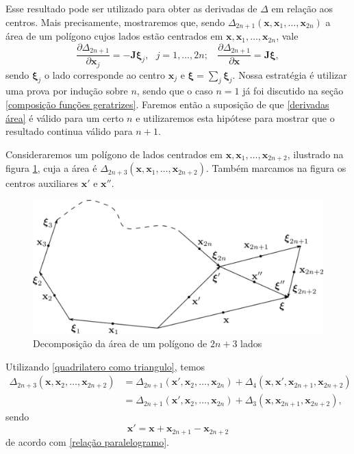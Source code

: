 \documentclass[
	12pt,
	oneside,			%
	a4paper,			%
	english,			%
	brazil				%
	]{abntex2}
\theoremstyle{definition}
\begin{document}
\begin{apendicesenv}
Esse resultado pode ser utilizado para obter as derivadas de $\Delta$ em relação aos centros. Mais precisamente, mostraremos que, sendo $\Delta_{2n+1}\left(\mathbf{x},\mathbf{x}_1,\ldots,\mathbf{x}_{2n}\right)$ a área de um polígono cujos lados estão centrados em $\mathbf{x},\mathbf{x}_1,\ldots,\mathbf{x}_{2n}$, vale
\begin{equation}
    \label{derivadas área}
    \frac{\partial \Delta_{2n+1}}{\partial \mathbf{x}_j} = - \mathbf{J} \boldsymbol{\xi}_j, \ \ \ j = 1,\ldots,2n; \ \ \ \ \frac{\partial \Delta_{2n+1}}{\partial \mathbf{x}} = \mathbf{J} \boldsymbol{\xi},
\end{equation}
sendo $\boldsymbol{\xi}_j$ o lado corresponde ao centro $\mathbf{x}_j$ e $\boldsymbol{\xi} = \sum_j \boldsymbol{\xi}_j$. Nossa estratégia é utilizar uma prova por indução sobre $n$, sendo que o caso $n=1$ já foi discutido na seção \ref{composição funções geratrizes}. Faremos então a suposição de que \eqref{derivadas área} é válido para um certo $n$ e utilizaremos esta hipótese para mostrar que o resultado continua válido para $n+1$.

Consideraremos um polígono de lados centrados em $\mathbf{x},\mathbf{x}_1,\ldots,\mathbf{x}_{2n+2}$, ilustrado na figura \ref{poligono grande}, cuja a área é $\Delta_{2n+3}\left(\mathbf{x},\mathbf{x}_1,\ldots,\mathbf{x}_{2n+2}\right)$. Também marcamos na figura os centros auxiliares $\mathbf{x}'$ e $\mathbf{x}''$.

\begin{figure}[H]
    \includegraphics[width=.8\textwidth]{Imagens/n_gon.png}
    \centering
    \caption{Decomposição da área de um polígono de $2n+3$ lados}
    \label{poligono grande}
\end{figure}

Utilizando \eqref{quadrilatero como triangulo}, temos
\begin{equation}
\label{delta 2n+3}
    \begin{aligned}
        \Delta_{2n+3}\left(\mathbf{x},\mathbf{x}_2,\ldots,\mathbf{x}_{2n+2}\right) &=  \Delta_{2n+1}\left(\mathbf{x}',\mathbf{x}_2,\ldots,\mathbf{x}_{2n}\right)+\Delta_4 \left(\mathbf{x}, \mathbf{x}', \mathbf{x}_{2n+1},\mathbf{x}_{2n+2}\right)\\&=  \Delta_{2n+1}\left(\mathbf{x}',\mathbf{x}_2,\ldots,\mathbf{x}_{2n}\right)+\Delta_3 \left(\mathbf{x},\mathbf{x}_{2n+1},\mathbf{x}_{2n+2}\right),
    \end{aligned}
\end{equation}
sendo
\begin{equation}
\label{xis linha}
    \mathbf{x}' = \mathbf{x}  + \mathbf{x}_{2n+1} - \mathbf{x}_{2n+2}
\end{equation}
de acordo com \eqref{relação paralelogramo}.


\end{apendicesenv}
\end{document}
